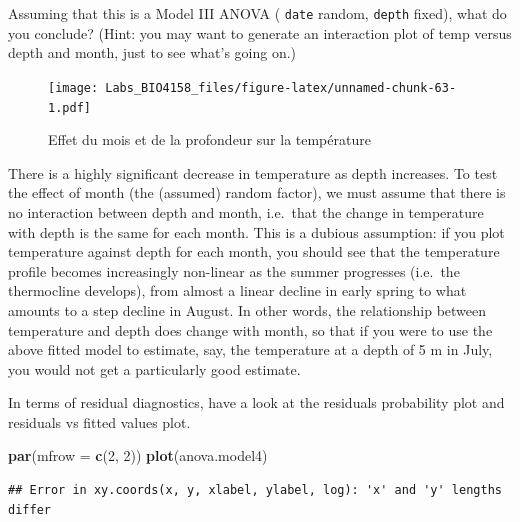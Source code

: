 \documentclass[
  12pt,
]{book}
\newenvironment{Shaded}{\begin{snugshade}}{\end{snugshade}}
\newcommand{\DataTypeTok}[1]{\textcolor[rgb]{0.13,0.29,0.53}{#1}}
\newcommand{\DecValTok}[1]{\textcolor[rgb]{0.00,0.00,0.81}{#1}}
\newcommand{\KeywordTok}[1]{\textcolor[rgb]{0.13,0.29,0.53}{\textbf{#1}}}
\newcommand{\NormalTok}[1]{#1}
\newcommand{\OperatorTok}[1]{\textcolor[rgb]{0.81,0.36,0.00}{\textbf{#1}}}
\begin{document}
Assuming that this is a Model III ANOVA ( \texttt{date} random, \texttt{depth} fixed), what do you conclude? (Hint: you may want to generate an interaction plot of temp versus depth and month, just to see what's going on.)

\begin{Shaded}
\end{Shaded}

\begin{figure}
\centering
\texttt{[image: Labs\_BIO4158\_files/figure-latex/unnamed-chunk-63-1.pdf]}
\caption{\label{fig:unnamed-chunk-63}Effet du mois et de la profondeur sur la température}
\end{figure}

There is a highly significant decrease in temperature as depth increases. To test the effect of month (the (assumed) random factor), we must assume that there is no interaction between depth and month, i.e.~that the change in temperature with depth is the same for each month. This is a dubious assumption: if you plot temperature against depth for each month, you should see that the temperature profile becomes increasingly non-linear as the summer progresses (i.e.~the thermocline develops), from almost a linear decline in early spring to what amounts to a step decline in August. In other words, the relationship between temperature and depth does change with month, so that if you were to use the above fitted model to estimate, say, the temperature at a depth of 5 m in July, you would not get a particularly good estimate.

In terms of residual diagnostics, have a look at the residuals probability plot and residuals vs fitted values plot.

\begin{Shaded}
\begin{Highlighting}[]
\KeywordTok{par}\NormalTok{(}\DataTypeTok{mfrow =} \KeywordTok{c}\NormalTok{(}\DecValTok{2}\NormalTok{, }\DecValTok{2}\NormalTok{))}
\KeywordTok{plot}\NormalTok{(anova.model4)}
\end{Highlighting}
\end{Shaded}

\begin{verbatim}
## Error in xy.coords(x, y, xlabel, ylabel, log): 'x' and 'y' lengths differ
\end{verbatim}
\end{document}
